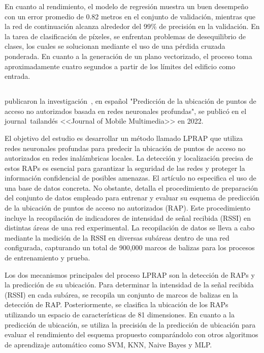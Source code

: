 En cuanto al rendimiento, el modelo de regresión muestra un buen desempeño con un error promedio de 0.82 metros en el conjunto de validación, mientras que la red de continuación alcanza alrededor del 99\% de precisión en la validación. En la tarea de clasificación de píxeles, se enfrentan problemas de desequilibrio de clases, los cuales se solucionan mediante el uso de una pérdida cruzada ponderada. En cuanto a la generación de un plano vectorizado, el proceso toma aproximadamente cuatro segundos a partir de los límites del edificio como entrada.

\subsection{}
\cite{pr_ketkhaw2019deepl}  publicaron la investigación , en español "Predicción de la ubicación de puntos de acceso no autorizados basada en redes neuronales profundas", se publicó en el journal tailandés <<Journal of Mobile Multimedia>> en 2022.

El objetivo del estudio es desarrollar un método llamado LPRAP que utiliza redes neuronales profundas para predecir la ubicación de puntos de acceso no autorizados en redes inalámbricas locales. La detección y localización precisa de estos RAPs es esencial para garantizar la seguridad de las redes y proteger la información confidencial de posibles amenazas. El artículo no especifica el uso de una base de datos concreta. No obstante, detalla el procedimiento de preparación del conjunto de datos empleado para entrenar y evaluar su esquema de predicción de la ubicación de puntos de acceso no autorizados (RAP). Este procedimiento incluye la recopilación de indicadores de intensidad de señal recibida (RSSI) en distintas áreas de una red experimental. La recopilación de datos se lleva a cabo mediante la medición de la RSSI en diversas subáreas dentro de una red configurada, capturando un total de 900,000 marcos de balizas para los procesos de entrenamiento y prueba.

Los dos mecanismos principales del proceso LPRAP son la detección de RAPs y la predicción de su ubicación. Para determinar la intensidad de la señal recibida (RSSI) en cada subárea, se recopila un conjunto de marcos de balizas en la detección de RAP. Posteriormente, se clasifica la ubicación de los RAPs utilizando un espacio de características de 81 dimensiones. En cuanto a la predicción de ubicación, se utiliza la precisión de la predicción de ubicación para evaluar el rendimiento del esquema propuesto comparándolo con otros algoritmos de aprendizaje automático como SVM, KNN, Naive Bayes y MLP.

